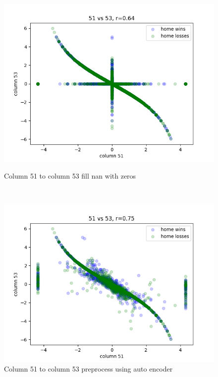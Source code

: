 \documentclass[12pt,a4paper]{article}
\begin{document}
\begin{figure}[h]
    \centering
    \begin{minipage}{.4\textwidth}
        \centering
        \includegraphics[width=0.8\linewidth]{0.64r_51_to_53.png}
        \caption[width=0.8\linewidth]{Column 51 to column 53 fill nan with zeros}
        \label{fig:51-53}
    \end{minipage}%
    \begin{minipage}{.1\textwidth}
        \ 
    \end{minipage}%
    \begin{minipage}{.4\textwidth}
        \centering
        \includegraphics[width=0.8\linewidth]{0.75r_51_to_53_recovered.png}
        \caption[width=0.8\linewidth]{Column 51 to column 53 preprocess using auto encoder}
        \label{fig:51-53r}
    \end{minipage}


\end{figure}
\end{document}
